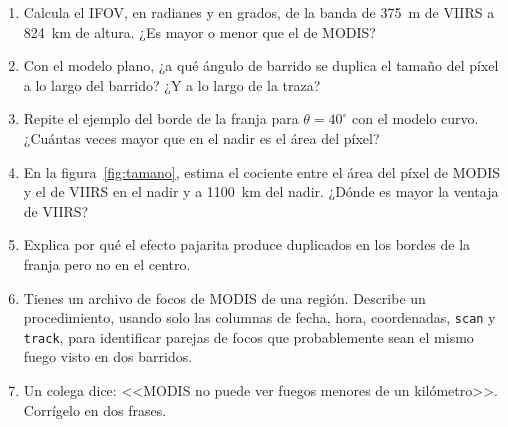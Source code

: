 \begin{enumerate}
  \item Calcula el IFOV, en radianes y en grados, de la banda de 375~m de VIIRS a 824~km de
  altura. ¿Es mayor o menor que el de MODIS?
  \item Con el modelo plano, ¿a qué ángulo de barrido se duplica el tamaño del píxel a lo largo
  del barrido? ¿Y a lo largo de la traza?
  \item Repite el ejemplo del borde de la franja para $\theta = 40^\circ$ con el modelo curvo.
  ¿Cuántas veces mayor que en el nadir es el área del píxel?
  \item En la figura~\ref{fig:tamano}, estima el cociente entre el área del píxel de MODIS y el
  de VIIRS en el nadir y a 1100~km del nadir. ¿Dónde es mayor la ventaja de VIIRS?
  \item Explica por qué el efecto pajarita produce duplicados en los bordes de la franja pero no
  en el centro.
  \item Tienes un archivo de focos de MODIS de una región. Describe un procedimiento, usando
  solo las columnas de fecha, hora, coordenadas, \texttt{scan} y \texttt{track}, para identificar
  parejas de focos que probablemente sean el mismo fuego visto en dos barridos.
  \item Un colega dice: <<MODIS no puede ver fuegos menores de un kilómetro>>. Corrígelo en dos
  frases.
\end{enumerate}
